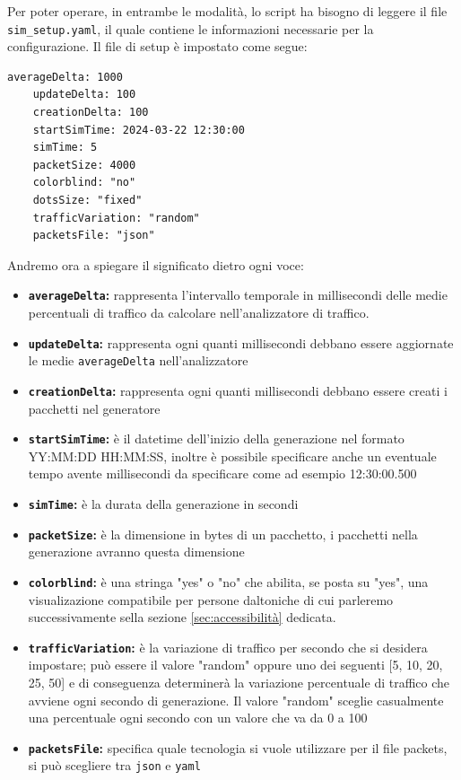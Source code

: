 \documentclass[binding=0.6cm]{sapthesis}
\begin{document}
   Per poter operare,
    in entrambe le modalità, lo script ha bisogno di leggere il file \texttt{sim\_setup.yaml}, il quale contiene le informazioni necessarie per la configurazione. 
    Il file di setup è impostato come segue:
{\scriptsize %
\begin{lstlisting}[caption={Esempio di setup file}, label={codice:sim_setup_example}]
    averageDelta: 1000
    updateDelta: 100
    creationDelta: 100
    startSimTime: 2024-03-22 12:30:00
    simTime: 5
    packetSize: 4000
    colorblind: "no"
    dotsSize: "fixed"
    trafficVariation: "random"
    packetsFile: "json"
\end{lstlisting}
}
Andremo ora a spiegare il significato dietro ogni voce:
\begin{itemize}
    \item \textbf{\texttt{averageDelta}:} rappresenta l'intervallo temporale in millisecondi 
    delle medie percentuali di traffico da calcolare nell'analizzatore di traffico.
    \item \textbf{\texttt{updateDelta}:} rappresenta ogni quanti millisecondi debbano essere aggiornate le medie \texttt{averageDelta} nell'analizzatore
    \item \textbf{\texttt{creationDelta}:} rappresenta ogni quanti millisecondi debbano essere creati i pacchetti nel generatore
    \item \textbf{\texttt{startSimTime}:} è il datetime dell'inizio della generazione nel formato \newline
    YY:MM:DD HH:MM:SS, inoltre è possibile specificare anche un eventuale tempo avente millisecondi da specificare come ad esempio 
    12:30:00.500
    \item \textbf{\texttt{simTime}:} è la durata della generazione in secondi
    \item \textbf{\texttt{packetSize}:} è la dimensione in bytes di un pacchetto, i pacchetti nella generazione avranno questa dimensione
    \item \textbf{\texttt{colorblind}:} è una stringa "yes" o "no" che abilita, se posta su "yes", una visualizazione compatibile per persone daltoniche
    di cui parleremo successivamente sella sezione \ref{sec:accessibilità} dedicata.
    \item \textbf{\texttt{trafficVariation}:} è la variazione di traffico per secondo che si desidera impostare; 
    può essere il valore "random" oppure uno dei seguenti [5, 10, 20, 25, 50] e 
    di conseguenza determinerà la variazione percentuale di traffico che avviene 
    ogni secondo di generazione. Il valore "random" sceglie casualmente una percentuale 
    ogni secondo con un valore che va da 0 a 100
    \item \textbf{\texttt{packetsFile}:} specifica quale tecnologia si vuole utilizzare per il file packets, 
    si può scegliere tra \texttt{json} e \texttt{yaml}
\end{itemize}
\end{document}
